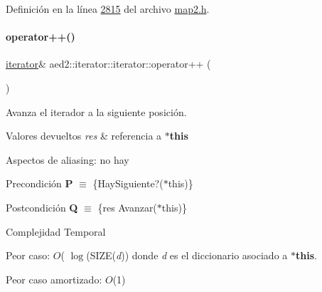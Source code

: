 Definición en la línea \hyperlink{map2_8h_source_l02815}{2815} del archivo \hyperlink{map2_8h_source}{map2.\+h}.

\mbox{\label{classaed2_1_1iterator_1_1iterator_a457fdf0ed06c88121b441424f1c99f4f_a457fdf0ed06c88121b441424f1c99f4f}} 
\paragraph{\texorpdfstring{operator++()}{operator++()}\hspace{0.1cm}{\footnotesize\ttfamily [1/2]}}
{\footnotesize\ttfamily \hyperlink{classaed2_1_1iterator_1_1iterator}{iterator}\& aed2\+::iterator\+::iterator\+::operator++ (\begin{DoxyParamCaption}{ }\end{DoxyParamCaption})\hspace{0.3cm}{\ttfamily [inline]}}



Avanza el iterador a la siguiente posición. 


\begin{DoxyRetVals}{Valores devueltos}
{\em res} & referencia a {\bfseries $\ast$this}\\
\hline
\end{DoxyRetVals}
\begin{DoxyParagraph}{Aspectos de aliasing\+:}
no hay
\end{DoxyParagraph}
\begin{DoxyPrecond}{Precondición}
{\bfseries P} $\equiv$ \{Hay\+Siguiente?($\ast$this)\} 
\end{DoxyPrecond}
\begin{DoxyPostcond}{Postcondición}
{\bfseries Q} $\equiv$ \{res  Avanzar($\ast$this)\}
\end{DoxyPostcond}

\begin{DoxyDescription}
\item[Complejidad Temporal]
\begin{DoxyItemize}
\item Peor caso\+: $O$( $\log$(S\+I\+ZE({\itshape d})) donde {\itshape d} es el diccionario asociado a {\bfseries $\ast$this}.
\item Peor caso amortizado\+: $O$(1) 
\end{DoxyItemize}
\end{DoxyDescription}

